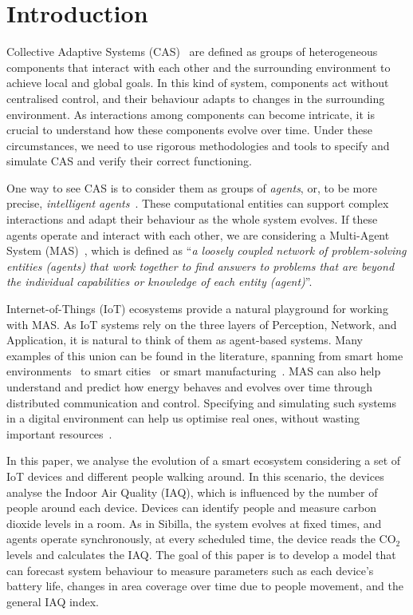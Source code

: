 \documentclass[runningheads]{llncs}
\newcommand{\sibilla}{\textsf{Sibilla}}
\begin{document}
\section{Introduction}\label{sec:intro}

Collective Adaptive Systems (CAS)~\cite{holzl2008engineering} are defined as groups of heterogeneous components that interact with each other and the surrounding environment to achieve local and global goals.
%
In this kind of system, components act without centralised control, and their behaviour adapts to changes in the surrounding environment.
%
As interactions among components can become intricate, it is crucial to understand how these components evolve over time.
%
Under these circumstances, we need to use rigorous methodologies and tools to specify and simulate CAS and verify their correct functioning.

One way to see CAS is to consider them as groups of \emph{agents}, or, to be more precise, \emph{intelligent agents}~\cite{wooldridge1995intelligent}. These computational entities can support complex interactions and adapt their behaviour as the whole system evolves.
%
If these agents operate and interact with each other, we are considering a Multi-Agent System (MAS)~\cite{Rocha17,wooldridge2009introduction,stone2000multiagent}, which is defined as ``\emph{a loosely coupled network of problem-solving entities (agents) that work together to find answers to problems that are beyond the individual capabilities or knowledge of each entity (agent)}''.

Internet-of-Things (IoT) ecosystems provide a natural playground for working with MAS. As IoT systems rely on the three layers of Perception, Network, and Application, it is natural to think of them as agent-based systems. 
%
Many examples of this union can be found in the literature, spanning from smart home environments~\cite{HarrabiHAZ24} to smart cities~\cite{nezamoddini2022survey} or smart manufacturing~\cite{alzubaidi2024multi}. MAS can also help understand and predict how energy behaves and evolves over time through distributed communication and control. Specifying and simulating such systems in a digital environment can help us optimise real ones, without wasting important resources~\cite{gonzalez2018multi,sadeeq2021design}.


In this paper, we analyse the evolution of a smart ecosystem considering a set of IoT devices and different people walking around. In this scenario, the devices analyse the Indoor Air Quality (IAQ), which is influenced by the number of people around each device. 
%
Devices can identify people and measure carbon dioxide levels in a room. As in \sibilla{}, the system evolves at fixed times, and agents operate synchronously, at every scheduled time, the device reads the CO$_2$ levels and calculates the IAQ.
%
%
The goal of this paper is to develop a model that can forecast system behaviour to measure parameters such as each device's battery life, changes in area coverage over time due to people movement, and the general IAQ index.
\end{document}
